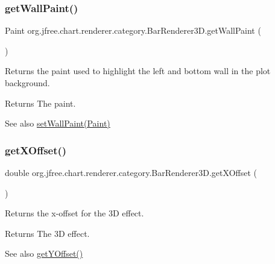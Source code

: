 \subsubsection{\texorpdfstring{get\+Wall\+Paint()}{getWallPaint()}}
{\footnotesize\ttfamily Paint org.\+jfree.\+chart.\+renderer.\+category.\+Bar\+Renderer3\+D.\+get\+Wall\+Paint (\begin{DoxyParamCaption}{ }\end{DoxyParamCaption})}

Returns the paint used to highlight the left and bottom wall in the plot background.

\begin{DoxyReturn}{Returns}
The paint.
\end{DoxyReturn}
\begin{DoxySeeAlso}{See also}
\mbox{\hyperlink{classorg_1_1jfree_1_1chart_1_1renderer_1_1category_1_1_bar_renderer3_d_a2476417310293633325cb376fb113727}{set\+Wall\+Paint(\+Paint)}} 
\end{DoxySeeAlso}
\mbox{\label{classorg_1_1jfree_1_1chart_1_1renderer_1_1category_1_1_bar_renderer3_d_acfc9f055dd8b9ac17882a4395996646e}} 
\subsubsection{\texorpdfstring{get\+X\+Offset()}{getXOffset()}}
{\footnotesize\ttfamily double org.\+jfree.\+chart.\+renderer.\+category.\+Bar\+Renderer3\+D.\+get\+X\+Offset (\begin{DoxyParamCaption}{ }\end{DoxyParamCaption})}

Returns the x-\/offset for the 3D effect.

\begin{DoxyReturn}{Returns}
The 3D effect.
\end{DoxyReturn}
\begin{DoxySeeAlso}{See also}
\mbox{\hyperlink{classorg_1_1jfree_1_1chart_1_1renderer_1_1category_1_1_bar_renderer3_d_ae0180e0a6256ed5d439f5f00a4f035a9}{get\+Y\+Offset()}} 
\end{DoxySeeAlso}


